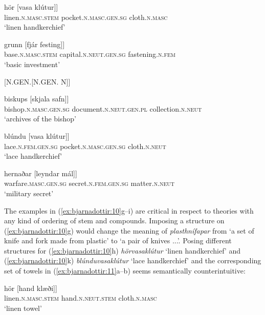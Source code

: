 \documentclass[output=paper]{LSP/langsci}
\begin{document}
\begin{xlist}
\begin{xlist}
\gll {\ob}hör [vasa klútur]] \\
 linen\textsc{.n.masc.stem} pocket\textsc{.n.masc.gen.sg} cloth\textsc{.n.masc}\\
\glt ‘linen handkerchief’

\gll {\ob}grunn [fjár festing]] \\
 base\textsc{.n.masc.stem} capital\textsc{.n.neut.gen.sg} fastening\textsc{.n.fem}\\
\glt ‘basic investment’
\end{xlist}
 	[N.GEN.[N.GEN. N]]
\begin{xlist}
\gll {\ob}biskups  [skjala safn]]\\
 bishop\textsc{.n.masc.gen.sg} document\textsc{.n.neut.gen.pl} collection\textsc{.n.neut}\hspace*{-2mm}\\
\glt ‘archives of the bishop’

\gll {\ob}blúndu [vasa klútur]]  \\
 lace\textsc{.n.fem.gen.sg} pocket\textsc{.n.masc.gen.sg} cloth\textsc{.n.neut}\\
\glt ‘lace handkerchief’

\gll {\ob}hernaðar [leyndar mál]] \\
 warfare\textsc{.masc.gen.sg} secret\textsc{.n.fem.gen.sg} matter\textsc{.n.neut}\\
\glt ‘military secret’
 \end{xlist}
\z
\z

The examples in (\ref{ex:bjarnadottir:10}g--i) are critical in respect to theories with any kind of ordering of stem and  compounds. Imposing a  structure on (\ref{ex:bjarnadottir:10}g) would change the meaning of \textit{plasthnífapar} from ‘a set of knife and fork made from plastic’ to ‘a pair of knives ...’. Posing different structures for (\ref{ex:bjarnadottir:10}h) \textit{hörvasa\-klútur} ‘linen handkerchief’ and (\ref{ex:bjarnadottir:10}k) \textit{blúnduvasaklútur} ‘lace handkerchief’ and the corresponding set of towels in (\ref{ex:bjarnadottir:11}a–b) seems semantically counterintuitive:

\ea%
 \label{ex:bjarnadottir:11} 
 
\ea 
\gll {\ob}hör [hand klæði]] \\
 linen\textsc{.n.masc.stem}  hand\textsc{.n.neut.stem} cloth\textsc{.n.masc}\\
\glt ‘linen towel’


\end{xlist}
\end{document}
